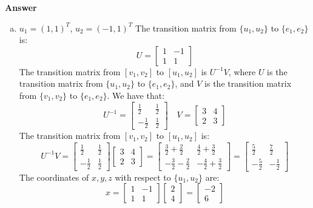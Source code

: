 \documentclass{article}
\begin{document}
\medskip
\noindent
\textbf{Answer}
\begin{enumerate}[(a)]
    \item 
    $u_1 = (1,1)^T$, $u_2 = (-1,1)^T$
    \newline
    The transition matrix from $\{u_1, u_2\}$ to $\{e_1, e_2\}$ is:
    $$ U = \begin{bmatrix} 1 & -1 \\ 1 & 1 \end{bmatrix} $$
    The transition matrix from $[v_1, v_2]$ to $[u_1, u_2]$ is $U^{-1}V$, 
    where $U$ is the transition matrix from $\{u_1, u_2\}$ to $\{e_1, e_2\}$, 
    and $V$ is the transition matrix from $\{v_1, v_2\}$ to $\{e_1, e_2\}$.
    We have that:
    $$ U^{-1} = \begin{bmatrix} \frac{1}{2} & \frac{1}{2} \\ -\frac{1}{2} & \frac{1}{2} \end{bmatrix} \quad 
    V = \begin{bmatrix} 3 & 4 \\ 2 & 3 \end{bmatrix} $$
    The transition matrix from $[v_1, v_2]$ to $[u_1, u_2]$ is:
    $$ U^{-1}V = \begin{bmatrix} \frac{1}{2} & \frac{1}{2} \\ -\frac{1}{2} & \frac{1}{2} \end{bmatrix} \begin{bmatrix} 3 & 4 \\ 2 & 3 \end{bmatrix}
     = \begin{bmatrix} \frac{3}{2} + \frac{2}{2} & \frac{4}{2} + \frac{3}{2} \\ -\frac{3}{2} - \frac{2}{2} & -\frac{4}{2} + \frac{3}{2} \end{bmatrix}
     = \begin{bmatrix} \frac{5}{2} & \frac{7}{2} \\ -\frac{5}{2} & -\frac{1}{2} \end{bmatrix} $$
    The coordinates of $x, y, z$ with respect to $\{u_1, u_2\}$ are:
    $$ 
    x = \begin{bmatrix} 1 & -1 \\ 1 & 1 \end{bmatrix} \begin{bmatrix} 2 \\ 4 \end{bmatrix}
     = \begin{bmatrix} -2 \\ 6 \end{bmatrix} 
$$
\end{enumerate}
\end{document}
